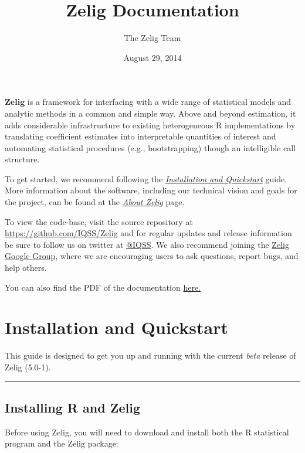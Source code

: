\documentclass[letterpaper,10pt,english]{sphinxmanual}
\title{Zelig Documentation}
\date{August 29, 2014}
\author{The Zelig Team}
\begin{document}
\maketitle
\tableofcontents
{}\label{index::doc}


\textbf{Zelig} is a framework for interfacing with a wide range of statistical models and analytic methods in a common and simple way. Above and beyond estimation, it adds considerable infrastructure to existing heterogeneous R implementations by translating coefficient estimates into interpretable quantities of interest and automating statistical procedures (e.g., bootstrapping) though an intelligible call structure.

To get started, we recommend following the {\hyperref[installation_quickstart:installation-quickstart]{\emph{Installation and Quickstart}}} guide. More information about the software, including our technical vision and goals for the project, can be found at the {\hyperref[about:about]{\emph{About Zelig}}} page.

To view the code-base, visit the source repository at \href{https://github.com/IQSS/Zelig}{https://github.com/IQSS/Zelig} and for regular updates  and release information be sure to follow us on twitter at \href{https://twitter.com/IQSS}{@IQSS}. We also recommend joining the \href{https://groups.google.com/forum/\#!forum/zelig-statistical-software}{Zelig Google Group}, where we are encouraging users to ask questions, report bugs, and help others.

You can also find the PDF of the documentation \href{http://zeligproject.org/build/latex/Zelig.pdf}{here.}


\chapter{Installation and Quickstart}
\label{installation_quickstart::doc}\label{installation_quickstart:welcome-to-zelig}\label{installation_quickstart:installation-and-quickstart}\label{installation_quickstart:installation-quickstart}
This guide is designed to get you up and running with the current \emph{beta} release of Zelig (5.0-1).


\bigskip\hrule{}\bigskip



\section{Installing R and Zelig}
\label{installation_quickstart:installing-r-and-zelig}
Before using Zelig, you will need to download and install both the R statistical program and the Zelig package:
\end{document}
